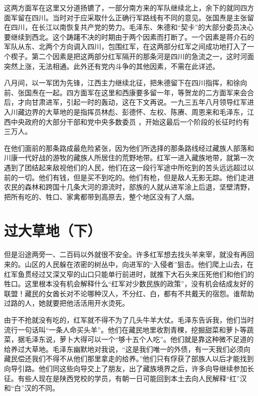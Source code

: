 \documentclass[10pt]{book}
\begin{document}
这两方面军在这里又分道扬镳了，一部分南方来的军队继续北上，余下的就同四方面军留在四川。当时对于应采取什么正确行军路线有不同的意见。张国焘是主张留在四川，在长江以南恢复共产党的势力。毛泽东、朱德和“契卡”的大部分委员决心要继续到西北。这个踌躇不决的时期由于两个因素而打断了。一个因素是蒋介石的军队从东、北两个方向调入四川，包围红军，在这两部分红军之间成功地打入了一个楔子。第二个因素是把这两部分红军隔开的那条河是四川的急流之一，这时河面突然上涨，无法相通。此外还有党内斗争的其他因素，不需在此详述。

八月间，以一军团为先锋，江西主力继续北征，把朱德留下在四川指挥，和徐向前、张国焘在一起。四方面军在这里和西康要多留一年，等贺龙的二方面军来会合后，才向甘肃进军，引起一时的轰动，这在下文再说。一九三五年八月领导红军进入川藏边界的大草地的是指挥员林彪、彭德怀、左权、陈赓、周恩来和毛泽东，江西中央政府的大部分干部和党中央多数委员 ，开始这最后一个阶段的长征时约有三万人。

在他们面前的那条路成最危险紧张，因为他们所选择的那条路线经过藏族人部落和川康一代好战的游牧的藏族人所居住的荒野地带。红军一进入藏族地带，就第一次遇到了团结起来敌视他们的人民，他们在这一段行军途中所吃到的苦头远远超过以前的一切。他们有钱，但是买不到吃的。他们有枪，但是敌人无影无踪。他们走进农民的森林和跨国十几条大河的源流时，部族的人就从进军涂上后退，坚壁清野，把所有吃的、牲口、家禽都带到高原去，整个地区没有了人烟。



\section{过大草地（下）}

但是沿途两旁一、二百码以外就很不安全。许多红军想去找头羊来宰，就没有再回来的。山区的人民躲在浓密的树丛中，向进军的“入侵者”狙击。他们爬上山去，在红军鱼贯经过又深又窄的山口只能单行前进时，就推下大石头来压死他们和他们的牲口。这里根本没有机会解释什么“红军对少数民族的政策”，没有机会结成友好的联盟！藏民的女酋长对不论哪种汉人，不分红、白，都有不共戴天的宿怨。谁帮助过路的人，她就要把他活活用开水烫死。

由于不抢就没有吃的，红军就不得不为了几头牛羊大仗。毛泽东告诉我，他们当时流行一句话叫“一条人命买头羊”。他们在藏民地里收割青稞，挖掘甜菜和萝卜等蔬菜，据毛泽东说，萝卜大得可以一个“够十五个人吃”。他们就是靠这种微不足道的给养过大草地。毛泽东幽默地对我说，“这是我们唯一的外债，有一天我们必须向藏民偿还我们不得不从他们那里拿走的给养。”他们只有俘获了部族人以后才能找到向导引路。他们同这些向导交上了朋友，出了藏族境界之后，许多向导继续参加长征。有些人现在是陕西党校的学员，有朝一日可能回到本土去向人民解释“红”汉和“白”汉的不同。
\end{document}
